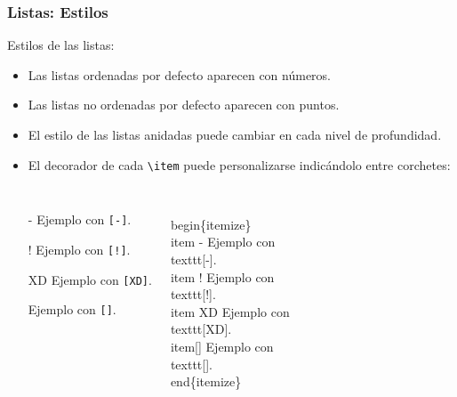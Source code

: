 \begin{frame}[fragile]
\frametitle{Listas: Estilos}
Estilos de las listas:
\begin{itemize}
    \item Las listas ordenadas por defecto aparecen con números.
    \item Las listas no ordenadas por defecto aparecen con puntos.
    \item El estilo de las listas anidadas puede cambiar en cada nivel de profundidad.
    \item El decorador de cada \verb|\item| puede personalizarse indicándolo entre corchetes:
\end{itemize}

\begin{columns}

\begin{itemize}
    \item[-] Ejemplo con \texttt{[-]}.
    \item[!] Ejemplo con \texttt{[!]}.
    \item[XD] Ejemplo con \texttt{[XD]}.
    \item[] Ejemplo con \texttt{[]}.
\end{itemize}

\begin{semiverbatim}
\\begin\{itemize\}
    \\item[-] Ejemplo con \\texttt{[-]}.
    \\item[!] Ejemplo con \\texttt{[!]}.
    \\item[XD] Ejemplo con \\texttt{[XD]}.
    \\item[] Ejemplo con \\texttt{[]}.
\\end\{itemize\}
\end{semiverbatim}
\end{columns}

\end{frame}
